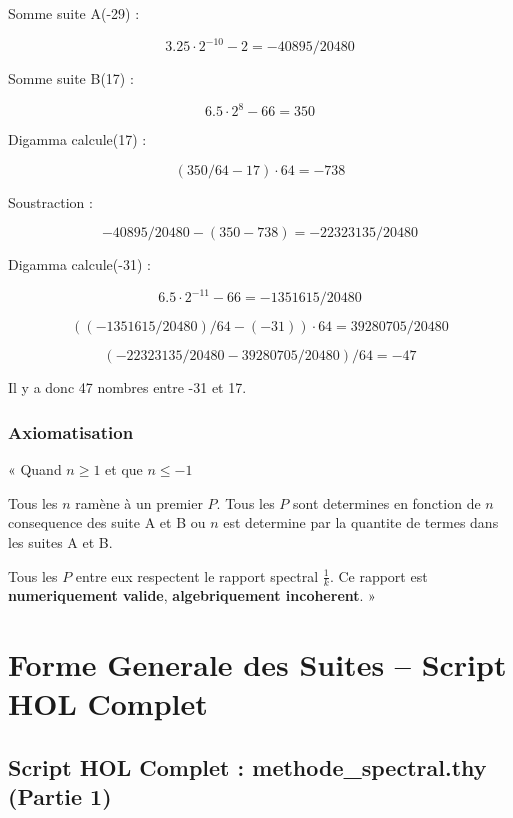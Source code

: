 \documentclass[a4paper,11pt]{article}
\begin{document}
Somme suite A(-29) :

\[
3.25 \cdot 2^{-10} - 2 = -40895/20480
\]

Somme suite B(17) :

\[
6.5 \cdot 2^{8} - 66 = 350
\]

Digamma calcule(17) :

\[
(350/64 - 17) \cdot 64 = -738
\]

Soustraction :

\[
-40895/20480 - (350 - 738) = -22323135/20480
\]

Digamma calcule(-31) :

\[
6.5 \cdot 2^{-11} - 66 = -1351615/20480
\]

\[
((-1351615/20480)/64 - (-31)) \cdot 64 = 39280705/20480
\]

\[
(-22323135/20480 - 39280705/20480)/64 = -47
\]

Il y a donc 47 nombres entre -31 et 17.


\subsubsection{Axiomatisation}

\begin{tcolorbox}[colback=blue!5,colframe=holblue,title={\textbf{Axiomatisation du Rapport Spectral}}]
« Quand $n \geq 1$ et que $n \leq -1$

Tous les $n$ ramène à un premier $P$. Tous les $P$ sont determines en fonction de $n$ consequence des suite A et B ou $n$ est determine par la quantite de termes dans les suites A et B.

Tous les $P$ entre eux respectent le rapport spectral $\frac{1}{k}$. Ce rapport est \textbf{numeriquement valide}, \textbf{algebriquement incoherent}. »
\end{tcolorbox}

\newpage
\section{Forme Generale des Suites -- Script HOL Complet}

\subsection{Script HOL Complet : methode\_spectral.thy (Partie 1)}
\end{document}
